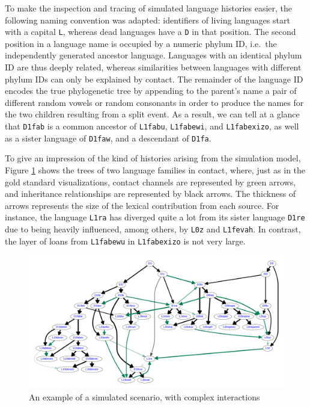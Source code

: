 To make the inspection and tracing of simulated language histories easier, the following naming convention was adapted: identifiers of living languages start with a capital \texttt{L}, whereas dead languages have a \texttt{D} in that position. The second position in a language name is occupied by a numeric phylum ID, i.e.\ the independently generated ancestor language. Languages with an identical phylum ID are thus deeply related, whereas similarities between languages with different phylum IDs can only be explained by contact. The remainder of the language ID encodes the true phylogenetic tree by appending to the parent's name a pair of different random vowels or random consonants in order to produce the names for the two children resulting from a split event. As a result, we can tell at a glance that \texttt{D1fab} is a common ancestor of \texttt{L1fabu}, \texttt{L1fabewi}, and \texttt{L1fabexizo}, as well as a sister language of \texttt{D1faw}, and a descendant of \texttt{D1fa}.

To give an impression of the kind of histories arising from the simulation model, Figure \ref{simulated-tree} shows the trees of two language families in contact, where, just as in the gold standard visualizations, contact channels are represented by green arrows, and inheritance relationships are represented by black arrows. The thickness of arrows represents the size of the lexical contribution from each source. For instance, the language \texttt{L1ra} has diverged quite a lot from its sister language \texttt{D1re} due to being heavily influenced, among others, by \texttt{L0z} and \texttt{L1fevah}. In contrast, the layer of loans from \texttt{L1fabewu} in \texttt{L1fabexizo} is not very large.

\begin{figure}
 \begin{center}
 \includegraphics[width=\textwidth]{figures/sim-example-goldstandard-graph.pdf}
 \caption{An example of a simulated scenario, with complex interactions}
 \label{simulated-tree}
 \end{center}
\end{figure}

